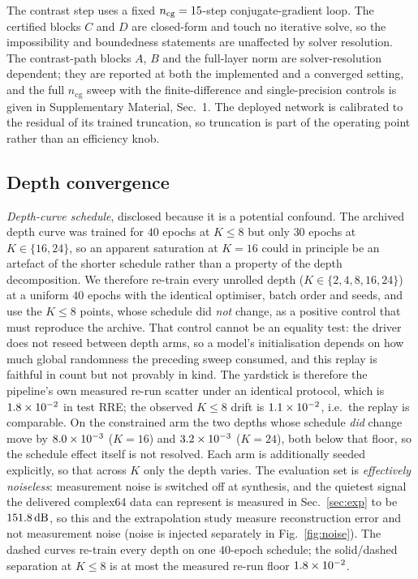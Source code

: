 \documentclass[journal,cmes,article,submit,moreauthors,pdftex]{Definitions/tsp}
\newcommand{\numv}[1]{#1}
\begin{document}
The contrast step uses a fixed $n_{\mathrm{cg}}=\numv{\NumNCg}$-step conjugate-gradient loop.
The certified blocks $C$ and $D$ are closed-form and touch no iterative solve, so the
impossibility and boundedness statements are unaffected by solver resolution. The contrast-path
blocks $A$, $B$ and the full-layer norm are solver-resolution dependent; they are reported at
both the implemented and a converged setting, and the full $n_{\mathrm{cg}}$ sweep with the
finite-difference and single-precision controls is given in Supplementary Material, Sec.~1.
The deployed network is calibrated to the residual of its trained truncation, so truncation is
part of the operating point rather than an efficiency knob.

\subsection{Depth convergence}\label{sec:depth}

\emph{Depth-curve schedule}, disclosed because it is a potential confound. The archived depth curve was trained for $40$ epochs at $K\le8$ but only $30$ epochs at
$K\in\{16,24\}$, so an apparent saturation at $K=16$ could in principle be an artefact of the
shorter schedule rather than a property of the depth decomposition. We therefore re-train every
unrolled depth ($K\in\{2,4,8,16,24\}$) at a uniform $40$ epochs with the identical optimiser,
batch order and seeds, and use the $K\le8$ points, whose schedule did \emph{not} change, as a
positive control that must reproduce the archive. That control cannot be an equality test: the
driver does not reseed between depth arms, so a model's initialisation depends on how much global
randomness the preceding sweep consumed, and this replay is faithful in count but not provably in
kind. The yardstick is therefore the pipeline's own measured re-run scatter under an identical
protocol, which is $\numv{\NumDepUniFloor}$ in test RRE; the observed
$K\le8$ drift is $\numv{\NumDepUniDrift}$, i.e.\ the replay is comparable. On the constrained arm
the two depths whose schedule \emph{did} change move by $\numv{\NumDepUniShiftSixteen}$ ($K=16$) and
$\numv{\NumDepUniShiftTwentyFour}$ ($K=24$), both below that floor, so the schedule effect itself is
not resolved. Each arm is additionally
seeded explicitly, so that across $K$ only the depth varies. 
The evaluation set is \emph{effectively noiseless}: measurement noise is switched off at synthesis, and the quietest signal the delivered complex64 data can represent is measured in Sec.~\ref{sec:exp} to be $\SI{\numv{\NumNoiseFloorDb}}{\decibel}$, so this and the extrapolation study measure reconstruction error and not measurement noise (noise is injected separately in Fig.~\ref{fig:noise}). The dashed curves re-train every depth on one $40$-epoch schedule; the solid/dashed separation at $K\le8$ is at most the measured re-run floor $\numv{\NumDepUniFloor}$.
\end{document}
